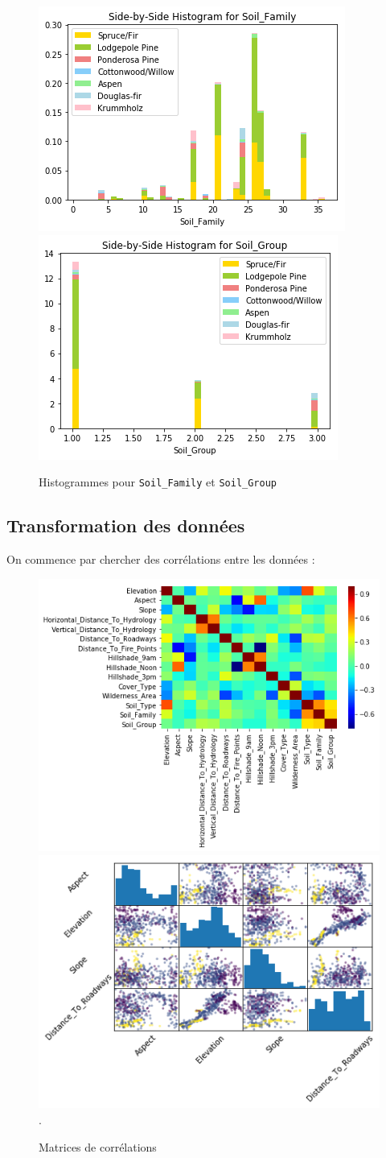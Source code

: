 \documentclass[12pt,a4paper]{article}
\numberwithin{equation}{section}
\begin{document}
	\begin{figure}[h]
		\centering
		\hfill
		\includegraphics[width=0.35\linewidth]{img/soil_family}
		\hfill
		\includegraphics[width=0.35\linewidth]{img/soil_group}
		\hfill
		\label{fig:soilhist}
		\caption{Histogrammes pour \texttt{Soil\_Family} et \texttt{Soil\_Group}}
	\end{figure}
		
	\pagebreak
	
	\subsection{Transformation des données}
	On commence par chercher des corrélations entre les données :
		
	\begin{figure}[h]
		\centering
		\includegraphics[width=.48\linewidth]{img/corr_matrix}
		\hfill
		\includegraphics[width=.5\linewidth]{img/scatter_matrix}.
		\caption{Matrices de corrélations}
	\end{figure}
\end{document}
